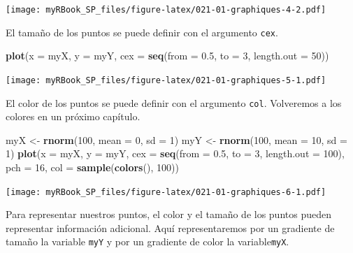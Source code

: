 \documentclass[
]{book}
\newenvironment{Shaded}{\begin{snugshade}}{\end{snugshade}}
\newcommand{\DataTypeTok}[1]{\textcolor[rgb]{0.13,0.29,0.53}{#1}}
\newcommand{\DecValTok}[1]{\textcolor[rgb]{0.00,0.00,0.81}{#1}}
\newcommand{\FloatTok}[1]{\textcolor[rgb]{0.00,0.00,0.81}{#1}}
\newcommand{\KeywordTok}[1]{\textcolor[rgb]{0.13,0.29,0.53}{\textbf{#1}}}
\newcommand{\NormalTok}[1]{#1}
\newcommand{\StringTok}[1]{\textcolor[rgb]{0.31,0.60,0.02}{#1}}
\begin{document}
\texttt{[image: myRBook\_SP\_files/figure-latex/021-01-graphiques-4-2.pdf]}

El tamaño de los puntos se puede definir con el argumento \texttt{cex}.

\begin{Shaded}
\begin{Highlighting}[]
\KeywordTok{plot}\NormalTok{(}\DataTypeTok{x =}\NormalTok{ myX, }\DataTypeTok{y =}\NormalTok{ myY, }
  \DataTypeTok{cex =} \KeywordTok{seq}\NormalTok{(}\DataTypeTok{from =} \FloatTok{0.5}\NormalTok{, }\DataTypeTok{to =} \DecValTok{3}\NormalTok{, }\DataTypeTok{length.out =} \DecValTok{50}\NormalTok{))}
\end{Highlighting}
\end{Shaded}

\texttt{[image: myRBook\_SP\_files/figure-latex/021-01-graphiques-5-1.pdf]}

El color de los puntos se puede definir con el argumento \texttt{col}. Volveremos a los colores en un próximo capítulo.

\begin{Shaded}
\begin{Highlighting}[]
\NormalTok{myX <-}\StringTok{ }\KeywordTok{rnorm}\NormalTok{(}\DecValTok{100}\NormalTok{, }\DataTypeTok{mean =} \DecValTok{0}\NormalTok{, }\DataTypeTok{sd =} \DecValTok{1}\NormalTok{)}
\NormalTok{myY <-}\StringTok{ }\KeywordTok{rnorm}\NormalTok{(}\DecValTok{100}\NormalTok{, }\DataTypeTok{mean =} \DecValTok{10}\NormalTok{, }\DataTypeTok{sd =} \DecValTok{1}\NormalTok{)}
\KeywordTok{plot}\NormalTok{(}\DataTypeTok{x =}\NormalTok{ myX, }\DataTypeTok{y =}\NormalTok{ myY, }
  \DataTypeTok{cex =} \KeywordTok{seq}\NormalTok{(}\DataTypeTok{from =} \FloatTok{0.5}\NormalTok{, }\DataTypeTok{to =} \DecValTok{3}\NormalTok{, }\DataTypeTok{length.out =} \DecValTok{100}\NormalTok{),}
  \DataTypeTok{pch =} \DecValTok{16}\NormalTok{,}
  \DataTypeTok{col =} \KeywordTok{sample}\NormalTok{(}\KeywordTok{colors}\NormalTok{(), }\DecValTok{100}\NormalTok{))}
\end{Highlighting}
\end{Shaded}

\texttt{[image: myRBook\_SP\_files/figure-latex/021-01-graphiques-6-1.pdf]}

Para representar nuestros puntos, el color y el tamaño de los puntos pueden representar información adicional. Aquí representaremos por un gradiente de tamaño la variable \texttt{myY} y por un gradiente de color la variable\texttt{myX}.
\end{document}
